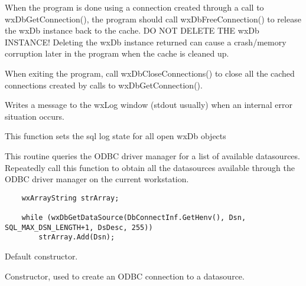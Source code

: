 When the program is done using a connection created through a call to
wxDbGetConnection(), the program should call wxDbFreeConnection() to release
the wxDb instance back to the cache.  DO NOT DELETE THE wxDb INSTANCE!
Deleting the wxDb instance returned can cause a crash/memory corruption
later in the program when the cache is cleaned up.

When exiting the program, call wxDbCloseConnections() to close all the
cached connections created by calls to wxDbGetConnection().



Writes a message to the wxLog window (stdout usually) when an internal
error situation occurs.



This function sets the sql log state for all open wxDb objects



This routine queries the ODBC driver manager for a list of available
datasources.  Repeatedly call this function to obtain all the datasources
available through the ODBC driver manager on the current workstation.

\begin{verbatim}
    wxArrayString strArray;

    while (wxDbGetDataSource(DbConnectInf.GetHenv(), Dsn, SQL_MAX_DSN_LENGTH+1, DsDesc, 255))
        strArray.Add(Dsn);
\end{verbatim}


\label{wxdbctor}


Default constructor.


Constructor, used to create an ODBC connection to a datasource.

